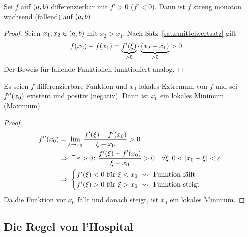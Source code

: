 \begin{korollar}[Monotonie] %
    \label{korollar:monotonie}
    Sei $f$ auf $\left(a,b\right)$ differenzierbar mit $f' > 0$ ($f' < 0$). Dann ist $f$ streng monoton wachsend (fallend) auf $\left(a,b\right)$.
    \begin{proof}
        Seien $x_1, x_2\in\left(a,b\right)$ mit $x_2 > x_1$. Nach Satz~\ref{satz:mittelwertsatz} gilt
        \begin{align*}
            f(x_2) - f(x_1) &= \underbrace{f'(\xi)}_{> 0}\cdot\underbrace{\left(x_2 - x_1\right)}_{> 0} > 0\qedhere
        \end{align*}
        Der Beweis für fallende Funktionen funktioniert analog.
    \end{proof}
\end{korollar}

\begin{bemerkung}
    Es seien $f$ differenzierbare Funktion und $x_0$ lokales Extremum von $f$ und sei $f''\of{x_0}$ existent und positiv (negativ). Dann ist $x_0$ ein lokales Minimum (Maximum).

    \begin{proof}
        \begin{align*}
            f''\of{x_0} &= \lim_{\xi\fromto x_0} \frac{f'\of{\xi} - f'\of{x_0}}{\xi-x_0} > 0\\
            &\impl \ex\varepsilon > 0\colon \frac{f'\of{\xi} - f'\of{x_0}}{\xi-x_0} > 0\quad\forall\xi, 0 < \abs{x_0-\xi} < \varepsilon\\
            &\impl \begin{cases}
                       f'\of{\xi} < 0 \text{ für } \xi < x_0~\leadsto \text{ Funktion fällt}\\
                       f'\of{\xi} > 0 \text{ für } \xi > x_0~\leadsto \text{ Funktion steigt}
            \end{cases}
        \end{align*}
        Da die Funktion vor $x_0$ fällt und danach steigt, ist $x_0$ ein lokales Minimum.
    \end{proof}
\end{bemerkung}

\newpage

\subsection{Die Regel von l'Hospital}

